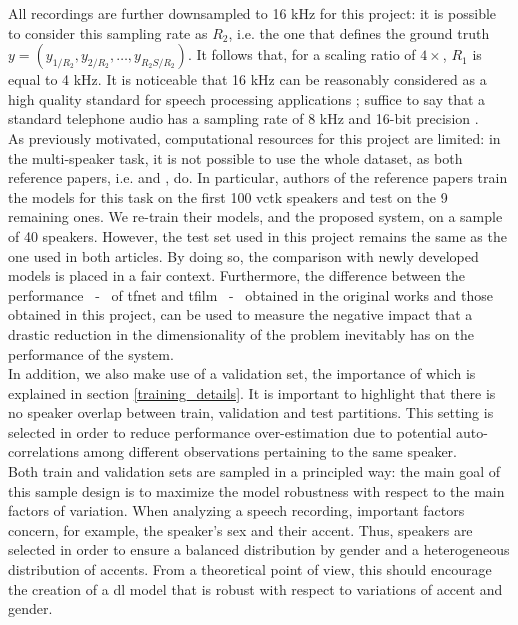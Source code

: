 All recordings are further downsampled to 16 kHz for this project: it is possible to consider this sampling rate as $R_2$, i.e. the one that defines the ground truth $y = (y_{1/R_2}, y_{2/R_2}, \dots, y_{R_2S/R_2})$. It follows that, for a scaling ratio of $4 \times$, $R_1$ is equal to 4 kHz. It is noticeable that 16 kHz can be reasonably considered as a high quality standard for speech processing applications \cite{steidl2009automatic}; suffice to say that a standard telephone audio has a sampling rate of 8 kHz and 16-bit precision \cite{kamath2019automatic}. \\
As previously motivated, computational resources for this project are limited: in the multi-speaker task, it is not possible to use the whole dataset, as both reference papers, i.e. \cite{lim2018time} and \cite{birnbaum2019temporal}, do. In particular, authors of the reference papers train the models for this task on the first 100 \gls{vctk} speakers and test on the 9 remaining ones. We re-train their models, and the proposed system, on a sample of 40 speakers. However, the test set used in this project remains the same as the one used in both articles. By doing so, the comparison with newly developed models is placed in a fair context. Furthermore, the difference between the performance ~-~ of \gls{tfnet} and \gls{tfilm} ~-~ obtained in the original works and those obtained in this project, can be used to measure the negative impact that a drastic reduction in the dimensionality of the problem inevitably has on the performance of the system. \\
In addition, we also make use of a validation set, the importance of which is explained in section \ref{training_details}. It is important to highlight that there is no speaker overlap between train, validation and test partitions. This setting is selected in order to reduce performance over-estimation due to potential auto-correlations among different observations pertaining to the same speaker. \\
Both train and validation sets are sampled in a principled way: the main goal of this sample design is to maximize the model robustness with respect to the main factors of variation. When analyzing a speech recording, important factors concern, for example, the speaker’s sex and their accent. Thus, speakers are selected in order to ensure a balanced distribution by gender and a heterogeneous distribution of accents. From a theoretical point of view, this should encourage the creation of a \gls{dl} model that is robust with respect to variations of accent and gender. \\
